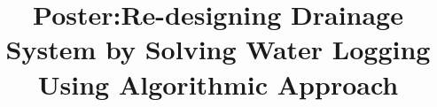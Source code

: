 \documentclass{acm_proc_article-sp}
\begin{document}
\title{Poster:Re-designing Drainage System by Solving Water Logging Using Algorithmic Approach}
%
%
%
%
%
\end{document}
